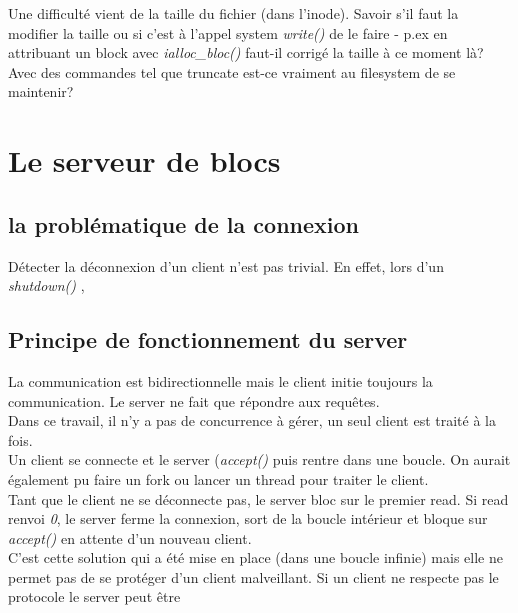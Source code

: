 \documentclass[a4paper,12pt]{article}
\begin{document}
Une difficulté vient de la taille du fichier (dans l'inode). Savoir s'il faut la modifier la taille ou si c'est à l'appel system \emph{write()} de le faire - p.ex en attribuant un block avec \emph{ialloc\_bloc()} faut-il corrigé la taille à ce moment là? Avec des commandes tel que truncate est-ce vraiment au filesystem de se maintenir?


\vspace{1cm}

\section{Le serveur de blocs}


\subsection{la problématique de la connexion}

Détecter la déconnexion d'un client n'est pas trivial. En effet, lors d'un \emph{shutdown()} , 

\subsection{Principe de fonctionnement du server}

La communication est bidirectionnelle mais le client initie toujours la communication. Le server ne fait que répondre aux requêtes.\\

Dans ce travail, il n'y a pas de concurrence à gérer, un seul client est traité à la fois.\\

Un client se connecte et le server (\emph{accept()} puis rentre dans une boucle. On aurait également pu faire un fork ou lancer un thread pour traiter le client.\\

Tant que le client ne se déconnecte pas, le server bloc sur le premier read. Si read renvoi \emph{0}, le server ferme la connexion, sort de la boucle intérieur et bloque sur \emph{accept()} en attente d'un nouveau client.\\

 C'est cette solution qui a été mise en place (dans une boucle infinie) mais elle ne permet pas de se protéger d'un client malveillant. Si un client ne respecte pas le protocole le server peut être 
\end{document}
